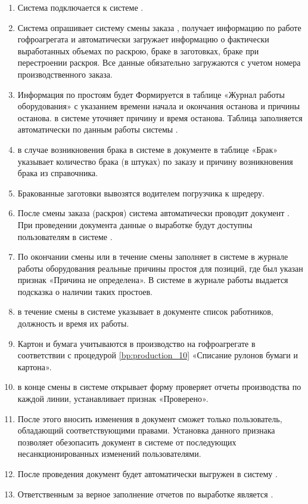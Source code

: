 \begin{enumerate}
\item  Система \gofro подключается к системе \syncro.
\item 	Система \gofro опрашивает систему смены заказа \syncro, получает информацию по работе гофроагрегата и автоматически загружает информацию о фактически выработанных объемах по раскрою, браке в заготовках, браке при перестроении раскроя. Все данные обязательно загружаются с учетом номера производственного заказа.
\item	Информация по простоям будет Формируется в таблице «Журнал работы оборудования» с указанием времени начала и окончания останова и причины останова. \gaoperator в системе \gofro уточняет причину и время останова. 
Таблица заполняется автоматически по данным работы системы \syncro.
\item	\gaoperator в случае возникновения брака  в системе \gofro в документе  в таблице «Брак» указывает количество брака (в штуках) по заказу и причину возникновения брака из справочника.
\item Бракованные заготовки вывозятся водителем погрузчика к шредеру.



\item После смены заказа (раскроя) система \gofro автоматически проводит документ . При проведении документа данные о выработке будут доступны пользователям в системе \gofro . 
\item 	 По окончании смены или в течение смены \gaoperator заполняет в системе \gofro  в журнале работы оборудования реальные причины простоя для позиций, где был указан признак «Причина не определена». В системе \gofro  в журнале работы выдается подсказка о наличии таких простоев.
\item 	\gaoperator в течение смены в системе \gofro  указывает в документе  список работников, должность и время их работы.
\item	Картон и бумага учитываются в производство на гофроагрегате в соответствии с процедурой \ref{bp:production_10} «Списание рулонов бумаги и картона».
\item	\master в конце смены в системе \gofro  открывает форму 
\master проверяет отчеты производства по каждой линии, устанавливает признак «Проверено».
\item		 После этого вносить изменения в документ сможет только пользователь, обладающий соответствующими правами. Установка данного признака позволяет обезопасить документ в системе \gofro от последующих несанкционированных изменений пользователями.
\item	После проведения документ  будет автоматически выгружен в систему \erp.
\item Ответственным за верное заполнение отчетов по выработке является \master.





\end{enumerate}
